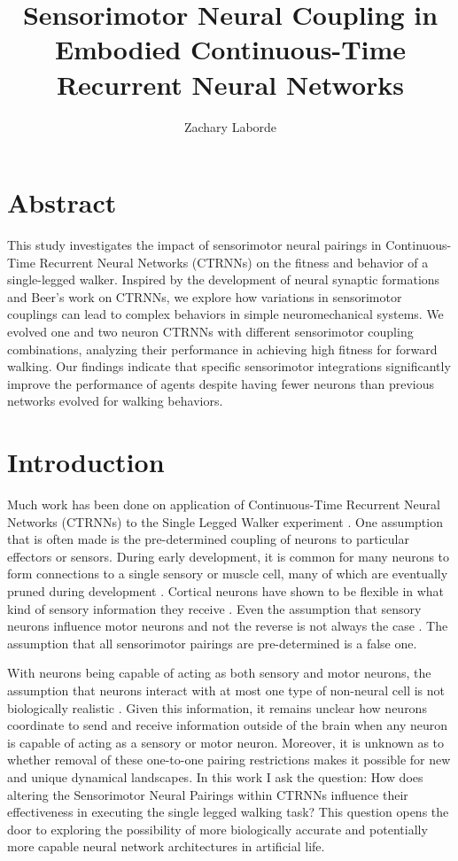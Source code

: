 \documentclass{article}
\title{Sensorimotor Neural Coupling in Embodied Continuous-Time Recurrent Neural Networks}
\author{Zachary Laborde}
\begin{document}
\maketitle

\section{Abstract}

This study investigates the impact of sensorimotor neural pairings in Continuous-Time Recurrent Neural Networks (CTRNNs) on the fitness and behavior of a single-legged walker. Inspired by the development of neural synaptic formations and Beer's work on CTRNNs, we explore how variations in sensorimotor couplings can lead to complex behaviors in simple neuromechanical systems. We evolved one and two neuron CTRNNs with different sensorimotor coupling combinations, analyzing their performance in achieving high fitness for forward walking. Our findings indicate that specific sensorimotor integrations significantly improve the performance of agents despite having fewer neurons than previous networks evolved for walking behaviors.

\section{Introduction}
Much work has been done on application of Continuous-Time Recurrent Neural Networks (CTRNNs) to the Single Legged Walker experiment \cite{BeerWalker}. One assumption that is often made is the pre-determined coupling of neurons to particular effectors or sensors. During early development, it is common for many neurons to form connections to a single sensory or muscle cell, many of which are eventually pruned during development \cite{AxonPruning}. Cortical neurons have shown to be flexible in what kind of sensory information they receive \cite{Ferret}. Even the assumption that sensory neurons influence motor neurons and not the reverse is not always the case \cite{CorollaryDischarge}. The assumption that all sensorimotor pairings are pre-determined is a false one.

With neurons being capable of acting as both sensory and motor neurons, the assumption that neurons interact with at most one type of non-neural cell is not biologically realistic \cite{CETouch}. Given this information, it remains unclear how neurons coordinate to send and receive information outside of the brain when any neuron is capable of acting as a sensory or motor neuron. Moreover, it is unknown as to whether removal of these one-to-one pairing restrictions makes it possible for new and unique dynamical landscapes. In this work I ask the question: How does altering the Sensorimotor Neural Pairings within CTRNNs influence their effectiveness in executing the single legged walking task? This question opens the door to exploring the possibility of more biologically accurate and potentially more capable neural network architectures in artificial life.
\end{document}
